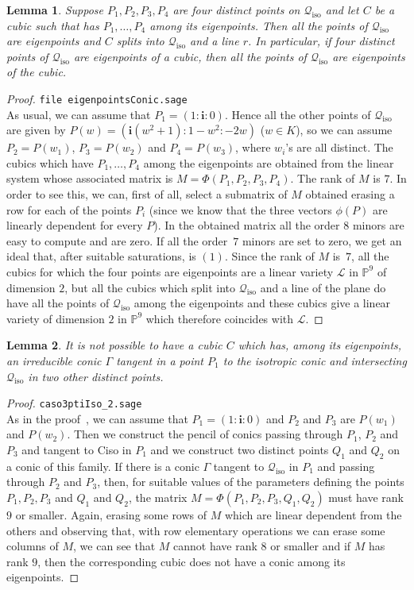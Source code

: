 \documentclass{amsart}
\theoremstyle{plain}
\newtheorem{lemma}{Lemma}[section]
\theoremstyle{definition}
\newcommand{\iso}{\mathcal{Q}_{\mathrm{iso}}}
\newcommand{\iii}{\textbf{i}}
\begin{document}
\begin{lemma}
\label{lemma:fourOnIso}
Suppose $P_1, P_2, P_3, P_4$ are four distinct points on $\iso$ and let
$C$ be a cubic such that has $P_1, \dots, P_4$ among its eigenpoints.
Then all the points of $\iso$ are eigenpoints and $C$ splits into $\iso$
and a line $r$. In particular, if four
distinct points of $\iso$ are eigenpoints of a cubic, then all the
points of $\iso$ are eigenpoints of the cubic.
\end{lemma}
\begin{proof}
\verb+file eigenpointsConic.sage+\\
As usual, we can assume that $P_1 = (1: \iii: 0)$. Hence all the other points
of $\iso$ are given by
$P(w) = (\iii(w^2 + 1): 1 - w^2: -2w)$ ($w\in K$), so we can assume
$P_2 = P(w_1)$, $P_3 = P(w_2)$ and $P_4 = P(w_3)$, where $w_i$'s are
all distinct. The cubics which have $P_1, \dots, P_4$ among the eigenpoints
are obtained from the linear system whose associated matrix is
$M = \Phi(P_1, P_2, P_3, P_4)$. The rank of $M$ is $7$. In order to see this,
we can, first of all, select a submatrix of $M$ obtained erasing a
row for each of the points $P_i$ (since we know that the three vectors
$\phi(P)$ are linearly dependent for every $P$). In the obtained matrix
all the order $8$ minors are easy to compute and are zero.
If all the order~$7$
minors are set to zero, we get an ideal that, after suitable saturations,
is $(1)$. Since the rank of $M$ is~$7$, all the cubics for which the
four points are eigenpoints are a linear variety $\mathcal{L}$
in $\mathbb{P}^9$
of dimension $2$, but all the cubics which split into $\iso$ and a line
of the plane do have all the points of $\iso$ among the eigenpoints and
these cubics give a linear variety of dimension $2$ in $\mathbb{P}^9$
which therefore coincides with $\mathcal{L}$.
\end{proof}

\begin{lemma}
\label{lemma3ptiSuCiso}
It is not possible to have a cubic $C$ which has, among its eigenpoints,
an irreducible conic $\Gamma$ tangent in a point $P_1$ to the isotropic
conic and intersecting $\iso$ in two other distinct points.
\end{lemma}
\begin{proof}
\verb+caso3ptiIso_2.sage+\\
As in the proof~, we can assume that
$P_1 = (1: \iii: 0)$
and $P_2$ and $P_3$ are $P(w_1)$ and $P(w_2)$. Then we construct
the pencil of conics passing through $P_1$, $P_2$ and $P_3$ and
tangent to Ciso in $P_1$ and we construct two distinct points
$Q_1$ and $Q_2$ on a conic of this family. If there is a conic $\Gamma$
tangent to $\iso$ in $P_1$ and passing through $P_2$ and $P_3$,
then, for suitable values of the parameters defining the points
$P_1, P_2, P_3$ and $Q_1$ and $Q_2$, the matrix
$M = \Phi(P_1, P_2, P_3, Q_1, Q_2)$
must have rank $9$ or smaller. Again, erasing some rows of $M$
which are linear dependent from the others and observing that,
with row elementary operations we can erase some columns of $M$,
we can see that $M$ cannot have rank $8$ or smaller and if $M$
has rank $9$, then the corresponding cubic does not have a conic
among its eigenpoints.
\end{proof}
\end{document}
